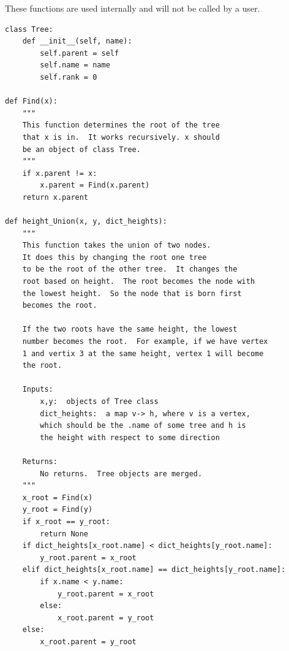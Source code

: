 \documentclass[codesnippet]{jss}
\begin{document}
These functions are used internally and will not be called by a user.  

\begin{verbatim}
class Tree:
	def __init__(self, name):
		self.parent = self
		self.name = name
		self.rank = 0
	
def Find(x):
	"""
	This function determines the root of the tree
	that x is in.  It works recursively. x should
	be an object of class Tree.
	"""
	if x.parent != x:
		x.parent = Find(x.parent)	
	return x.parent

def height_Union(x, y, dict_heights):
	"""
	This function takes the union of two nodes.
	It does this by changing the root one tree
	to be the root of the other tree.  It changes the
	root based on height.  The root becomes the node with
	the lowest height.  So the node that is born first
	becomes the root.  

	If the two roots have the same height, the lowest 
	number becomes the root.  For example, if we have vertex
	1 and vertix 3 at the same height, vertex 1 will become
	the root.  

	Inputs:
		x,y:  objects of Tree class
		dict_heights:  a map v-> h, where v is a vertex,
		which should be the .name of some tree and h is
		the height with respect to some direction
        
    Returns:
        No returns.  Tree objects are merged.
	"""
	x_root = Find(x)
	y_root = Find(y)
	if x_root == y_root:
		return None
	if dict_heights[x_root.name] < dict_heights[y_root.name]:
		y_root.parent = x_root
	elif dict_heights[x_root.name] == dict_heights[y_root.name]:
		if x.name < y.name:
			y_root.parent = x_root
		else:
			x_root.parent = y_root
	else:
		x_root.parent = y_root
		
\end{verbatim}
\end{document}
